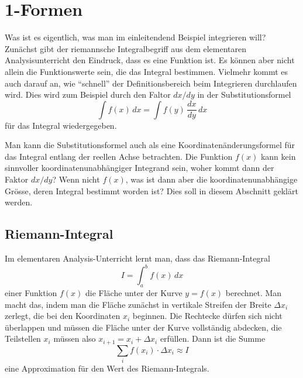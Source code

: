 %
%
\section{1-Formen}
%
Was ist es eigentlich, was man im einleitendend Beispiel integrieren
will?
Zunächst gibt der riemannsche Integralbegriff aus dem elementaren
Analysisunterricht den Eindruck, dass es eine Funktion ist.
%
Es können aber nicht allein die Funktionswerte sein, die das Integral
bestimmen.
Vielmehr kommt es auch darauf an, wie ``schnell'' der Definitionsbereich
beim Integrieren durchlaufen wird.
Dies wird zum Beispiel durch den Faltor $dx/dy$ in der Substitutionsformel
\[
\int f(x)\,dx
=
\int f(y)\, \frac{dx}{dy}\,dx
\]
für das Integral wiedergegeben.

Man kann die Substitutionsformel auch als eine Koordinatenänderungsformel
für das Integral entlang der reellen Achse betrachten.
Die Funktion $f(x)$ kann kein sinnvoller koordinatenunabhängiger 
Integrand sein, woher kommt dann der Faktor $dx/dy$?
Wenn nicht $f(x)$, was ist dann aber die koordinatenunabhängige Grösse,
deren Integral bestimmt worden ist?
Dies soll in diesem Abschnitt geklärt werden.

%
%
\subsection{Riemann-Integral}
%
Im elementaren Analysis-Unterricht lernt man, dass das Riemann-Integral
\[
I
=
\int_a^b f(x)\,dx
\]
einer Funktion $f(x)$ die Fläche unter der Kurve $y=f(x)$ berechnet.
Man macht das, indem man die Fläche zunächst in vertikale Streifen
der Breite $\Delta x_i$ zerlegt, die bei den Koordinaten $x_i$
beginnen.
Die Rechtecke dürfen sich nicht überlappen und müssen die Fläche unter
der Kurve vollständig abdecken, die Teilstellen $x_i$ müssen
also $x_{i+1}=x_i+\Delta x_i$ erfüllen.
Dann ist die Summe
\begin{equation}
\sum_{i} f(x_i)\cdot \Delta x_i
\approx 
I
\label{buch:kurvenintegral:1-form:eqn:riemann-summe}
\end{equation}
eine Approximation für den Wert des Riemann-Integrals.

